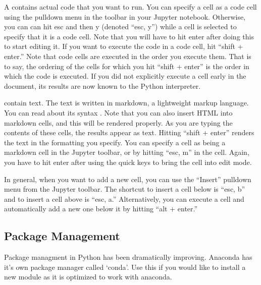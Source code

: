 \documentclass[letterpaper,10pt,english]{sphinxmanual}
\begin{document}
A  contains actual code that you want to run. You can specify a cell as a code cell using the pulldown menu in the toolbar in your Jupyter notebook. Otherwise, you can can hit esc and then y (denoted “esc, y”) while a cell is selected to specify that it is a code cell. Note that you will have to hit enter after doing this to start editing it.
If you want to execute the code in a code cell, hit “shift + enter.” Note that code cells are executed in the order you execute them. That is to say, the ordering of the cells for which you hit “shift + enter” is the order in which the code is executed. If you did not explicitly execute a cell early in the document, its results are now known to the Python interpreter.

 contain text. The text is written in markdown, a lightweight markup language. You can read about its syntax . Note that you can also insert HTML into markdown cells, and this will be rendered properly. As you are typing the contents of these cells, the results appear as text. Hitting “shift + enter” renders the text in the formatting you specify.  You can specify a cell as being a markdown cell in the Jupyter toolbar, or by hitting “esc, m” in the cell. Again, you have to hit enter after using the quick keys to bring the cell into edit mode.

In general, when you want to add a new cell, you can use the “Insert” pulldown menu from the Jupyter toolbar. The shortcut to insert a cell below is “esc, b” and to insert a cell above is “esc, a.” Alternatively, you can execute a cell and automatically add a new one below it by hitting “alt + enter.”

\begin{sphinxVerbatim}[commandchars=\\\{\}]
\end{sphinxVerbatim}


\subsection{Package Management}
\label{\detokenize{content/Introduction_to_Programming:package-management}}
Package managment in Python has been dramatically improving.  Anaconda has it’s own package manager called ‘conda’.  Use this if you would like to install a new module as it is optimized to work with anaconda.
\end{document}
